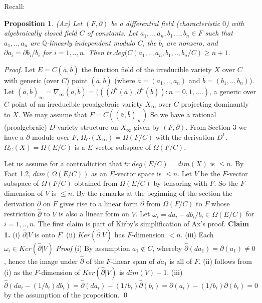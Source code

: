 \documentclass[12pt]{article}
\newtheorem{Proposition}[Theorem]{Proposition}
\newcommand{\Q}{\mathbb Q}  \newcommand{\Qq}{\mathbb Q}
\begin{document}
Recall:
\begin{Proposition} (Ax)
Let $(F,\partial)$ be a differential field (characteristic $0$) with algebraically closed field $C$ of constants.
Let $a_{1},..,a_{n}, b_{1},..,b_{n} \in F$ such that $a_{1},..,a_{n}$ are $\Q$-linearly independent modulo $C$, the $b_{i}$ are nonzero, and 
$\partial a_{i} = \partial b_{i}/b_{i}$ for $i=1,..,n$. Then $tr.deg(C(a_{1},..,a_{n}, b_{1},..,b_{n}/C) \geq n+1$.
\end{Proposition}
\begin{proof}  Let $E = C({\bar a}, {\bar b})$ the function field of the irreducible variety $X$ over $C$ with generic (over $C$) point $({\bar a}, {\bar b})$ (where ${\bar a} = (a_{1},..,a_{n})$ and ${\bar b} = (b_{1},..,b_{n})$). 
Let $({\bar a}, {\bar b})_{\infty} = \nabla_{\infty}({\bar a}, {\bar b}) = (((\partial^{n}({\bar a}),\partial^{n}({\bar b})): n=0,1,....)$, 
a generic over $C$ point of an irreducible proalgebraic variety $X_{\infty}$ over $C$ projecting dominantly to $X$.  We may assume that $F = C(({\bar a},{\bar b})_{\infty})$
So we have a rational (proalgebraic) $D$-variety structure on $X_{\infty}$ given by $(F,\partial)$. 
From Section 3 we have a $\partial$-module over $F$, $\Omega_{C}(X_{\infty}) = \Omega(F/C)$ with the derivation $D^{1}$. 
$\Omega_{C}(X) = \Omega(E/C)$ is a $E$-vector subspace of $\Omega(F/C)$. 

Let us assume for a contradiction that $tr.deg(E/C) = dim(X)$ is $\leq n$.  By  Fact 1.2, $dim(\Omega(E/C))$ as an $E$-vector space is $\leq n$. Let $V$ be the $F$-vector subspace of $\Omega(F/C)$ obtained from $\Omega(E/C)$ by 
tensoring with $F$.  So the $F$-dimension of $V$ is $\leq n$. By the remarks at the beginning of the section the derivation $\partial$ on $F$ gives rise to a linear form $\hat\partial$ from $\Omega(F/C)$ to $F$ whose restriction $
\hat\partial$ to $V$ is also a linear form on $V$.
Let $\omega_{i} = da_{i} - db_{i}/b_{i} \in \Omega(E/C)$ for $i=1,..,n$.   The first claim is part of  Kirby's simplification of Ax's proof. 
\newline
{\bf Claim 1.}  (i) ${\hat\partial}|V$ is onto $F$.
\newline
(ii)  $Ker({\hat\partial}|V)$ has $F$-dimension $< n$. 
\newline
(iii) Each $\omega_{i}\in Ker({\hat\partial}|V)$
\newline
{\em Proof}  (i) By assumption $a_{1}\notin C$, whereby ${\hat\partial}(da_{1}) = \partial (a_{1}) \neq 0$, hence the image under $\hat\partial$ of the $F$-linear span of $da_{1}$ is all of $F$. 
\newline
(ii) follows from (i) as the $F$-dimension of $Ker({\hat\partial}|V)$ is $dim(V) - 1$.
\newline
(iii)  ${\hat\partial}(da_{i} - (1/b_{i})db_{i}) = {\hat\partial}(da_{i}) - (1/b_{i}){\hat\partial}(b_{i}) = \partial(a_{i} ) - (1/b_{i})\partial(b_{i}) = 0$ by the assumption of the proposition.  \qed


\end{proof}
\end{document}
